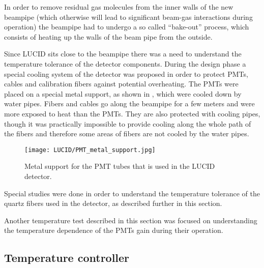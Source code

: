 In order to remove residual gas molecules from the inner walls of the new beampipe (which otherwise will lead to significant beam-gas interactions during operation)
the beampipe had to undergo a so called ``bake-out'' process, which consists of heating up the walls of the beam pipe from the outside.

Since LUCID sits close to the beampipe there was a need to understand the temperature tolerance of the detector components.
During the design phase a special cooling system of the detector was proposed in order to protect PMTs, cables and calibration fibers against potential overheating.
The PMTs were placed on a special metal support, as shown in , which were cooled down by water pipes.
Fibers and cables go along the beampipe for a few meters and were more exposed to heat than the PMTs.
They are also protected with cooling pipes, though it was practically impossible to provide cooling along the whole path of the fibers 
and therefore some areas of fibers are not cooled by the water pipes.

\begin{figure}
\centering
\texttt{[image: LUCID/PMT\_metal\_support.jpg]}
\caption{Metal support for the PMT tubes that is used in the LUCID detector.}
\label{fig:metalSupport}
\end{figure}

Special studies were done in order to understand the temperature tolerance of the quartz fibers used in the detector, as described further in this section.


Another temperature test described in this section was focused on understanding the temperature dependence of the PMTs gain during their operation.

\subsection{Temperature controller}
\label{subsec:tempController}

